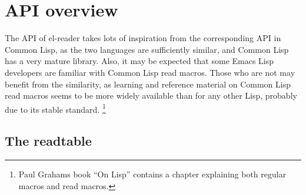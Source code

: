 \documentclass[a4paper,10pt,twoside]{article}
\newcommand{\el}{Emacs Lisp}
\newcommand{\cl}{Common Lisp}
\newcommand{\elr}{el-reader}
\begin{document}
\begin{comment}
characters may be treated as a number, if they form a token, and they are
compatible with the input base.

\paragraph{Package marker}
\label{par:package-marker}

characters were only implemented because \cl{} has them.  The only character
with this trait is the colon.  As Emacs uses so called obarrays to intern its
symbols, and it is not possible to intern a symbol into more than one array
, it is not possible to clone \cl{}s packaging mechanism to Emacs.  Hence this
syntax type is not of particular importance.

\paragraph{Plus sign, minus sign, dot, decimal point, ratio marker and exponent
  marker}
\label{par:number-traits}

are used while constructing numbers.

\paragraph{Invalid}
\label{par:invalid}

Should a character with this trait be encountered, an error is thrown.  So far,
\elr{} does not specify any characters to be of invalid trait.
\end{comment}

\section{API overview}
\label{sec:api-overview}

The API of \elr{} takes lots of inspiration from the corresponding API in
\cl{}, as the two languages are sufficiently similar, and \cl{} has a very
mature library.  Also, it may be expected that some \el{} developers are
familiar with \cl{} read macros.  Those who are not may benefit from the
similarity, as learning and reference material on \cl{} read macros seems to be
more widely available than for any other Lisp, probably due to its stable
standard.  \footnote{Paul Grahams book ``On Lisp''\cite[p.~224]{on-lisp}
  contains a chapter explaining both regular macros and read macros.}

\subsection{The readtable}
\label{subsec:readtable}
\end{document}
